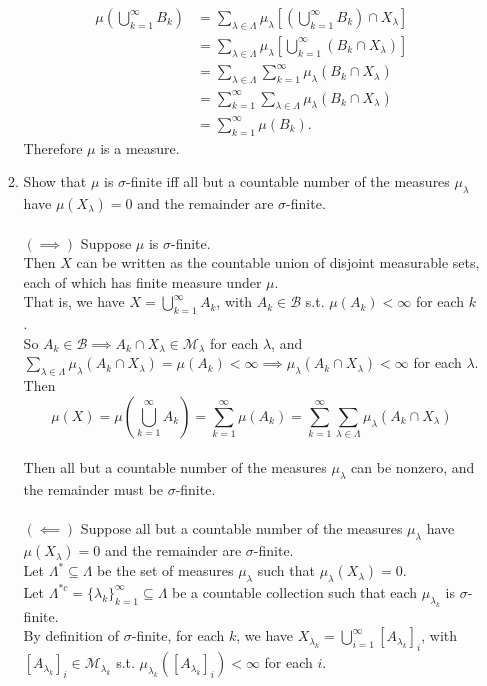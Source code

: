 \begin{enumerate}
\begin{enumerate}[label=(\roman*),align=left]
		\begin{align*}
			\mu(\bigcup_{k=1}^\infty B_k)&= \sum_{\lambda\in\Lambda}\mu_\lambda[(\bigcup_{k=1}^\infty B_k)\cap X_\lambda]\\
			&=\sum_{\lambda\in\Lambda}\mu_\lambda[\bigcup_{k=1}^\infty (B_k\cap X_\lambda)]\\
			&=\sum_{\lambda\in\Lambda}\sum_{k=1}^\infty \mu_\lambda(B_k\cap X_\lambda)\\
			&=\sum_{k=1}^\infty \sum_{\lambda\in\Lambda} \mu_\lambda(B_k\cap X_\lambda)\\
			&=\sum_{k=1}^\infty \mu(B_k).
		\end{align*}
		Therefore $\mu$ is a measure.
		\item Show that $\mu$ is $\sigma$-finite iff all but a countable number of the measures $\mu_\lambda$ have $\mu(X_\lambda)=0$ and the remainder are $\sigma$-finite.\\
		\\$(\implies)$ Suppose $\mu$ is $\sigma$-finite.\\
		Then $X$ can be written as the countable union of disjoint measurable sets, each of which has finite measure under $\mu$.
		\\That is, we have $X=\bigcup_{k=1}^\infty A_k$, with $A_k\in\mathcal{B}$ s.t. $\mu(A_k)<\infty$ for each $k$.
		\\So $A_k\in\mathcal{B}\implies A_k\cap X_\lambda\in\mathcal{M}_\lambda$ for each $\lambda$, and $\sum_{\lambda\in\Lambda} \mu_\lambda(A_k\cap X_\lambda)=\mu(A_k)<\infty\implies\mu_\lambda(A_k\cap X_\lambda)<\infty$ for each $\lambda$.
		\\Then 
		\[
			\mu(X)=\mu(\bigcup_{k=1}^\infty A_k)=\sum_{k=1}^\infty\mu(A_k)=\sum_{k=1}^\infty\sum_{\lambda\in\Lambda} \mu_\lambda(A_k\cap X_\lambda)
		\]
		\\Then all but a countable number of the measures $\mu_\lambda$ can be nonzero, and the remainder must be $\sigma$-finite.\\
		\\$(\impliedby)$ Suppose all but a countable number of the measures $\mu_\lambda$ have $\mu(X_\lambda)=0$ and the remainder are $\sigma$-finite.\\
		Let $\Lambda^*\subseteq\Lambda$ be the set of measures $\mu_\lambda$ such that $\mu_\lambda(X_\lambda)=0$.
		\\Let $\Lambda^{*c}=\{\lambda_k\}_{k=1}^\infty\subseteq\Lambda$ be a countable collection such that each $\mu_{\lambda_k}$ is $\sigma$-finite.
		\\By definition of $\sigma$-finite, for each $k$, we have $X_{\lambda_k}=\bigcup_{i=1}^\infty [A_{\lambda_k}]_i$, with $[A_{\lambda_k}]_i\in\mathcal{M}_{\lambda_k}$ s.t. $\mu_{\lambda_k}([A_{\lambda_k}]_i)<\infty$ for each $i$.

\end{enumerate}
\end{enumerate}
